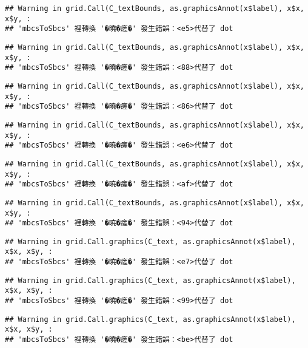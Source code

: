 \documentclass[
]{article}
\begin{document}
\begin{verbatim}
## Warning in grid.Call(C_textBounds, as.graphicsAnnot(x$label), x$x, x$y, :
## 'mbcsToSbcs' 裡轉換 '�曉�瘥�' 發生錯誤：<e5>代替了 dot
\end{verbatim}

\begin{verbatim}
## Warning in grid.Call(C_textBounds, as.graphicsAnnot(x$label), x$x, x$y, :
## 'mbcsToSbcs' 裡轉換 '�曉�瘥�' 發生錯誤：<88>代替了 dot
\end{verbatim}

\begin{verbatim}
## Warning in grid.Call(C_textBounds, as.graphicsAnnot(x$label), x$x, x$y, :
## 'mbcsToSbcs' 裡轉換 '�曉�瘥�' 發生錯誤：<86>代替了 dot
\end{verbatim}

\begin{verbatim}
## Warning in grid.Call(C_textBounds, as.graphicsAnnot(x$label), x$x, x$y, :
## 'mbcsToSbcs' 裡轉換 '�曉�瘥�' 發生錯誤：<e6>代替了 dot
\end{verbatim}

\begin{verbatim}
## Warning in grid.Call(C_textBounds, as.graphicsAnnot(x$label), x$x, x$y, :
## 'mbcsToSbcs' 裡轉換 '�曉�瘥�' 發生錯誤：<af>代替了 dot
\end{verbatim}

\begin{verbatim}
## Warning in grid.Call(C_textBounds, as.graphicsAnnot(x$label), x$x, x$y, :
## 'mbcsToSbcs' 裡轉換 '�曉�瘥�' 發生錯誤：<94>代替了 dot
\end{verbatim}

\begin{verbatim}
## Warning in grid.Call.graphics(C_text, as.graphicsAnnot(x$label), x$x, x$y, :
## 'mbcsToSbcs' 裡轉換 '�曉�瘥�' 發生錯誤：<e7>代替了 dot
\end{verbatim}

\begin{verbatim}
## Warning in grid.Call.graphics(C_text, as.graphicsAnnot(x$label), x$x, x$y, :
## 'mbcsToSbcs' 裡轉換 '�曉�瘥�' 發生錯誤：<99>代替了 dot
\end{verbatim}

\begin{verbatim}
## Warning in grid.Call.graphics(C_text, as.graphicsAnnot(x$label), x$x, x$y, :
## 'mbcsToSbcs' 裡轉換 '�曉�瘥�' 發生錯誤：<be>代替了 dot
\end{verbatim}
\end{document}

